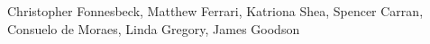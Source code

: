 Christopher Fonnesbeck, Matthew Ferrari, Katriona Shea, Spencer Carran, Consuelo de Moraes, Linda Gregory, James Goodson